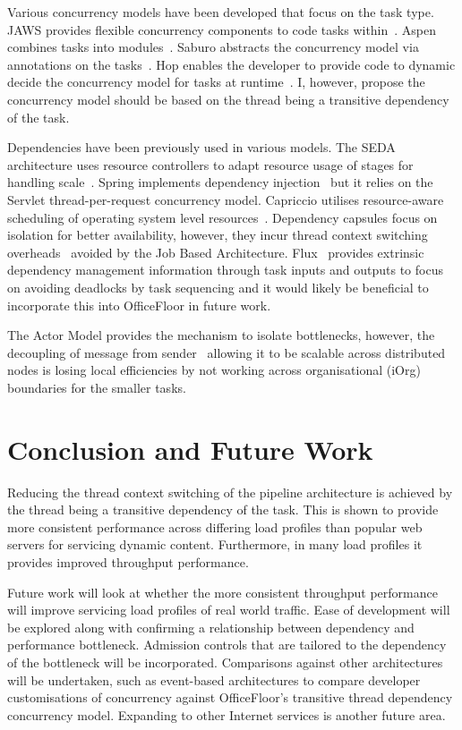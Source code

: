 \documentclass[conference]{ieee/IEEEtran}
\begin{document}
Various concurrency models have been developed that focus on the task type.
JAWS provides flexible concurrency components to code tasks within~\cite{jaws}.
Aspen combines tasks into modules~\cite{aspen}.  Saburo abstracts the
concurrency model via annotations on the tasks~\cite{saburo}.  Hop enables the
developer to provide code to dynamic decide the concurrency model for tasks at
runtime~\cite{hop}.  I, however, propose the concurrency model should be based
on the thread being a transitive dependency of the task.

Dependencies have been previously used in various models.  The SEDA architecture
uses resource controllers to adapt resource usage of stages for handling
scale~\cite{seda}.  Spring implements dependency injection~\cite{ioc} but it
relies on the Servlet thread-per-request concurrency model.  Capriccio utilises
resource-aware scheduling of operating system level resources~\cite{capriccio}.
Dependency capsules focus on isolation for better availability, however, they
incur thread context switching overheads~\cite{dependency-capsules} avoided by
the Job Based Architecture.  Flux~\cite{flux} provides extrinsic dependency
management information through task inputs and outputs to focus on avoiding
deadlocks by task sequencing and it would likely be beneficial to incorporate
this into OfficeFloor in future work.

The Actor Model provides the mechanism to isolate bottlenecks, however, the
decoupling of message from sender~\cite{actors} allowing it to be scalable
across distributed nodes is losing local efficiencies by not working across
organisational (iOrg) boundaries for the smaller tasks.


\section{Conclusion and Future Work}
Reducing the thread context switching of the pipeline architecture is achieved
by the thread being a transitive dependency of the task.  This is shown to
provide more consistent performance across differing load profiles than popular
web servers for servicing dynamic content.  Furthermore, in many load profiles
it provides improved throughput performance.

Future work will look at whether the more consistent throughput performance will
improve servicing load profiles of real world traffic.  Ease of development will
be explored along with confirming a relationship between dependency and
performance bottleneck.  Admission controls that are tailored to the dependency
of the bottleneck will be incorporated.  Comparisons against other architectures
will be undertaken, such as event-based architectures to compare developer
customisations of concurrency against OfficeFloor's transitive thread dependency
concurrency model.  Expanding to other Internet services is another future area.
\end{document}
